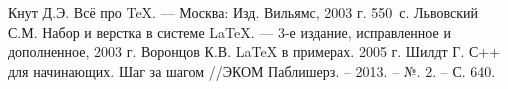 \documentclass[12pt,a4paper]{scrartcl}
\begin{document}
	\begin{thebibliography}{9}
	Кнут Д.Э. Всё про \TeX. \newblock --- Москва: Изд. Вильямс, 2003 г. 550~с.
	Львовский С.М. Набор и верстка в системе \LaTeX{}. \newblock --- 3-е издание, исправленное и дополненное, 2003 г.
	Воронцов К.В. \LaTeX{} в примерах. 2005 г.
	Шилдт Г. С++ для начинающих. Шаг за шагом //ЭКОМ Паблишерз. – 2013. – №. 2. – С. 640.

	\end{thebibliography}
	
\end{document}
